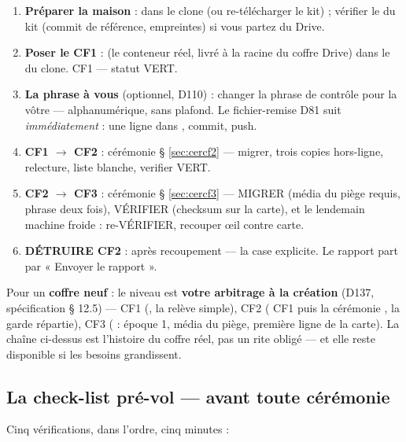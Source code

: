 \begin{enumerate}
\item \textbf{Préparer la maison} :  dans le clone (ou re-télécharger
le kit) ; vérifier le  du kit (commit de référence, empreintes)
si vous partez du Drive.
\item \textbf{Poser le CF1} :  (le conteneur réel, livré à la
racine du coffre Drive) dans le  du clone. CF1 — statut
VERT.
\item \textbf{La phrase à vous} (optionnel, D110) : changer la phrase de contrôle
pour la vôtre — alphanumérique, sans plafond. Le fichier-remise D81 suit
\emph{immédiatement} : une ligne dans , commit, push.
\item \textbf{CF1 $\to$ CF2} : cérémonie § \ref{sec:cercf2} — migrer, trois copies
hors-ligne, relecture, liste blanche, verifier VERT.
\item \textbf{CF2 $\to$ CF3} : cérémonie § \ref{sec:cercf3} — MIGRER (média du piège
requis, phrase deux fois), VÉRIFIER (checksum sur la carte), et le lendemain machine
froide : re-VÉRIFIER, recouper œil contre carte.
\item \textbf{DÉTRUIRE CF2} : après recoupement — la case explicite. Le rapport
part par « Envoyer le rapport ».
\end{enumerate}

Pour un \textbf{coffre neuf} : le niveau est \textbf{votre arbitrage à la création}
(D137, spécification § 12.5) — CF1 (, la relève simple),
CF2 ( CF1 puis la cérémonie , la garde
répartie), CF3 ( : époque 1, média du piège, première
ligne de la carte). La chaîne ci-dessus est l'histoire du coffre réel, pas un rite
obligé — et elle reste disponible si les besoins grandissent.

\subsection{La check-list pré-vol — avant toute cérémonie}\label{sec:preflight}

Cinq vérifications, dans l'ordre, cinq minutes :

